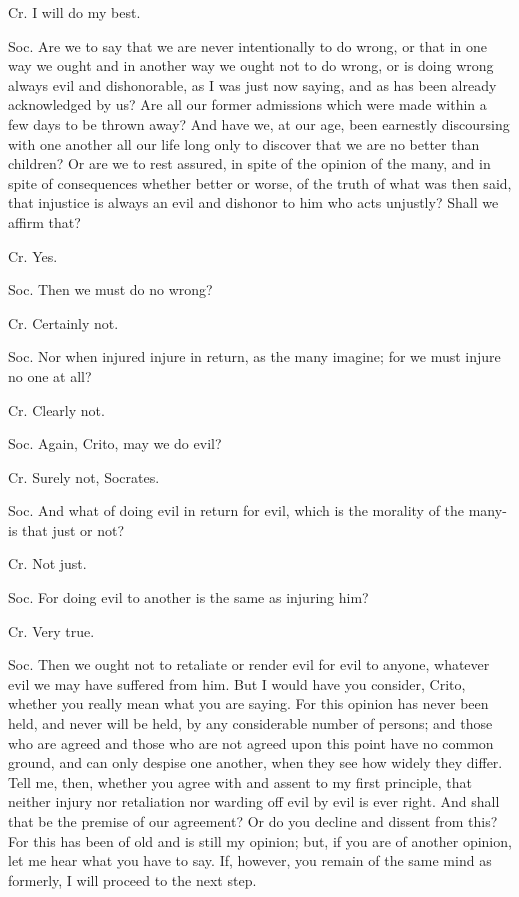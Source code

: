 Cr. I will do my best. 

Soc. Are we to say that we are never intentionally to do wrong, or
that in one way we ought and in another way we ought not to do wrong,
or is doing wrong always evil and dishonorable, as I was just now
saying, and as has been already acknowledged by us? Are all our former
admissions which were made within a few days to be thrown away? And
have we, at our age, been earnestly discoursing with one another all
our life long only to discover that we are no better than children?
Or are we to rest assured, in spite of the opinion of the many, and
in spite of consequences whether better or worse, of the truth of
what was then said, that injustice is always an evil and dishonor
to him who acts unjustly? Shall we affirm that? 

Cr. Yes. 

Soc. Then we must do no wrong? 

Cr. Certainly not. 

Soc. Nor when injured injure in return, as the many imagine; for we
must injure no one at all? 

Cr. Clearly not. 

Soc. Again, Crito, may we do evil? 

Cr. Surely not, Socrates. 

Soc. And what of doing evil in return for evil, which is the morality
of the many-is that just or not? 

Cr. Not just. 

Soc. For doing evil to another is the same as injuring him?

Cr. Very true. 

Soc. Then we ought not to retaliate or render evil for evil to anyone,
whatever evil we may have suffered from him. But I would have you
consider, Crito, whether you really mean what you are saying. For
this opinion has never been held, and never will be held, by any considerable
number of persons; and those who are agreed and those who are not
agreed upon this point have no common ground, and can only despise
one another, when they see how widely they differ. Tell me, then,
whether you agree with and assent to my first principle, that neither
injury nor retaliation nor warding off evil by evil is ever right.
And shall that be the premise of our agreement? Or do you decline
and dissent from this? For this has been of old and is still my opinion;
but, if you are of another opinion, let me hear what you have to say.
If, however, you remain of the same mind as formerly, I will proceed
to the next step. 

